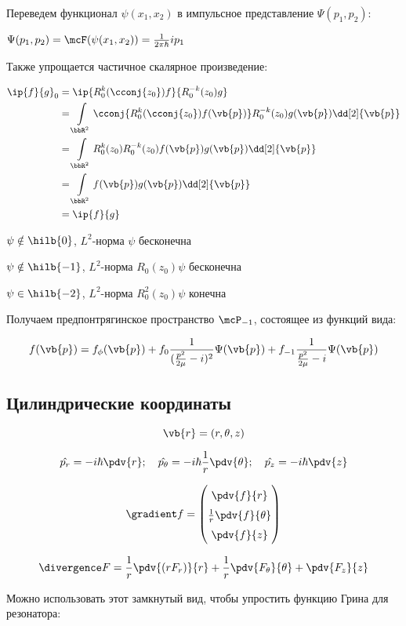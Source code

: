 Переведем функционал $\psi(x_1, x_2)$ в импульсное представление $\Psi(p_1, p_2)$:

$\Psi(p_1, p_2) = \mcF(\psi(x_1, x_2)) = \frac{1}{2 \pi \hbar} i p_1$

Также упрощается частичное скалярное произведение:

\begin{align*}
\ip{f}{g}_0
&= \ip{R_0^k(\cconj{z_0}) f}{R_0^{-k}(z_0) g} \\
&= \int\limits_{\bbR^2} \cconj{R_0^k(\cconj{z_0}) f(\vb{p})} R_0^{-k}(z_0) g(\vb{p}) \dd[2]{\vb{p}} \\
&= \int\limits_{\bbR^2} R_0^k(z_0) R_0^{-k}(z_0) f(\vb{p}) g(\vb{p}) \dd[2]{\vb{p}} \\
&= \int\limits_{\bbR^2} f(\vb{p}) g(\vb{p}) \dd[2]{\vb{p}} \\
&= \ip{f}{g}
\end{align*}

$\psi \notin \hilb{0}$, $L^2$-норма $\psi$ бесконечна

$\psi \notin \hilb{-1}$, $L^2$-норма $R_0(z_0) \psi$ бесконечна

$\psi \in \hilb{-2}$, $L^2$-норма $R_0^2(z_0) \psi$ конечна

Получаем предпонтрягинское пространство $\mcP_{-1}$, состоящее из функций вида:

\[
f(\vb{p}) = f_\phi(\vb{p}) + f_0 \frac{1}{(\frac{p^2}{2 \mu} - i)^2} \Psi(\vb{p}) + f_{-1} \frac{1}{\frac{p^2}{2 \mu} - i} \Psi(\vb{p})
\]

\subsection{Цилиндрические координаты}

\[
\vb{r} = (r, \theta, z)
\]

\[
\hat {p_r} = - i \hbar \pdv{r};\quad 
\hat{p_\theta} = - i \hbar \frac{1}{r} \pdv{\theta};\quad 
\hat{p_z} = - i \hbar \pdv{z}
\]

$$\renewcommand\arraystretch{1.5}
\gradient f = 
\begin{pmatrix}
\pdv{f}{r} \\
\frac{1}{r} \pdv{f}{\theta}  \\
\pdv{f}{z} 
\end{pmatrix}
$$


$$
\divergence F =
\frac{1}{r} \pdv{(r F_r)}{r}
+ \frac{1}{r} \pdv{F_\theta}{\theta}
+ \pdv{F_z}{z}
$$



Можно использовать этот замкнутый вид, чтобы упростить функцию Грина для резонатора:

